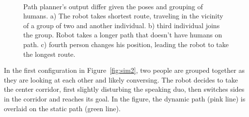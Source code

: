\documentclass[3p]{elsarticle}
\begin{document}
\begin{figure}[ht!]
\centering
%
         \\
        
    \caption{%
	Path planner's output differ given the poses and grouping of humans. a) The robot takes shortest route, traveling in the vicinity of a group of two and another individual. b) third individual joins the group. Robot takes a longer path that doesn't have humans on path. c) fourth person changes his position, leading the robot to take the longest route.
     }%
   \label{fig:sim}
\end{figure}



In the first configuration in Figure~\ref{fig:sim2}, two people are grouped together as they are looking at each other and likely conversing. The robot decides to take the center corridor, first slightly disturbing the speaking duo, then switches sides in the corridor and reaches its goal. In the figure, the dynamic path (pink line) is overlaid on the static path (green line). 
\end{document}
